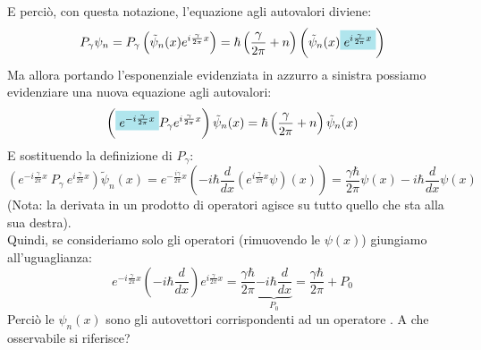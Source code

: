 \documentclass[../../FisicaTeorica.tex]{subfiles}
\begin{document}
E perciò, con questa notazione, l'equazione agli autovalori diviene:
\[
P_\gamma \psi_n = P_\gamma\left(\tilde{\psi}_n(x) e^{i\frac{\gamma}{2\pi}x}\right) = \hbar \left(\frac{\gamma}{2\pi}+n\right)\left(\tilde{\psi}_n(x) \hlc{SkyBlue}{e^{i\frac{\gamma}{2\pi}x}}\right )
\]
Ma allora portando l'esponenziale evidenziata in azzurro a sinistra possiamo evidenziare una nuova equazione agli autovalori:
\[
\left( \hlc{SkyBlue}{e^{-i\frac{\gamma}{2\pi}x}}P_\gamma e^{i\frac{\gamma}{2\pi}x}\right )\tilde{\psi}_n(x) = \hbar \left(\frac{\gamma}{2\pi}+n\right)\tilde{\psi}_n(x)
\]
E sostituendo la definizione di $P_\gamma$:
\[
\left(e^{-i\frac{\gamma}{2\pi}x}\ P_\gamma\ e^{i\frac{\gamma}{2\pi}x}\right){\widetilde{\psi}}_n\left(x\right)=
e^{-\frac{i\gamma}{2\pi}x}\left(-i\hbar\frac{d}{dx}\left(e^{i\frac{\gamma}{2\pi}x}\psi\right)\left(x\right)\right)=\frac{\gamma\hbar}{2\pi}\psi
\left(x\right)-i\hbar \frac{d}{dx}\psi(x)
\]
(Nota: la derivata in un prodotto di operatori agisce su tutto quello che sta alla sua destra).\\
Quindi, se consideriamo solo gli operatori (rimuovendo le $\psi(x)$) giungiamo all'uguaglianza:
\[
e^{-i\frac{\gamma}{2\pi}x}\left(-i\hbar\frac{d}{dx}\right)e^{i\frac{\gamma}{2\pi}x}=\frac{\gamma\hbar}{2\pi}\underbrace{-i\hbar \frac{d}{dx}}_{P_0} = \frac{\gamma \hbar}{2\pi} + P_0
\]
Perciò le $\psi_n(x)$ sono gli autovettori corrispondenti ad un operatore . A che osservabile si riferisce?\\
\end{document}
